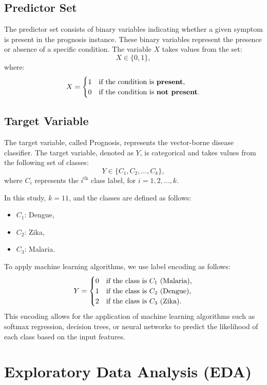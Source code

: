 \documentclass{article}
\begin{document}
\subsection{Predictor Set}

The predictor set consists of binary variables indicating whether a given symptom is present
in the prognosis instance. These binary variables represent the presence or absence of a specific
condition. The variable \( X \) takes values from the set:
\[
X \in \{0, 1\},
\]
where:
\[
X =
\begin{cases}
1 & \text{if the condition is \textbf{present}}, \\
0 & \text{if the condition is \textbf{not present}}.
\end{cases}
\]

\subsection{Target Variable}

The target variable, called Prognosis, represents the vector-borne disease classifier. The target
variable, denoted as \( Y \), is categorical and takes values from the following set of classes:
\[
Y \in \{ C_1, C_2, \dots, C_k \},
\] 
where \( C_i \) represents the \( i^{\text{th}} \) class label, for \( i = 1, 2, \dots, k \).

In this study, \( k = 11 \), and the classes are defined as follows:
\begin{itemize}
    \item \( C_1 \): Dengue,
    \item \( C_2 \): Zika,
    \item \( C_3 \): Malaria.
\end{itemize}
To apply machine learning algorithms, we use label encoding as follows:
\[
Y = 
\begin{cases} 
0 & \text{if the class is \( C_1 \) (Malaria)}, \\
1 & \text{if the class is \( C_2 \) (Dengue)}, \\
2 & \text{if the class is \( C_3 \) (Zika)}.
\end{cases}
\]
This encoding allows for the application of machine learning algorithms such as softmax regression, decision trees, or neural networks to predict the likelihood of each class based on the input features.

\section{Exploratory Data Analysis (EDA)}
\end{document}
